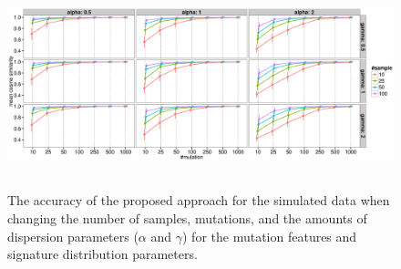 \clearpage

\begin{figure}[b]
\centering
\includegraphics[width=16cm,height=6cm]{simulation_result.eps}
\caption{The accuracy of the proposed approach for the simulated data 
when changing the number of samples, mutations, 
and the amounts of dispersion parameters ($\alpha$ and $\gamma$) for the mutation features and signature distribution parameters.
}
\label{sim_facet}
\end{figure}



